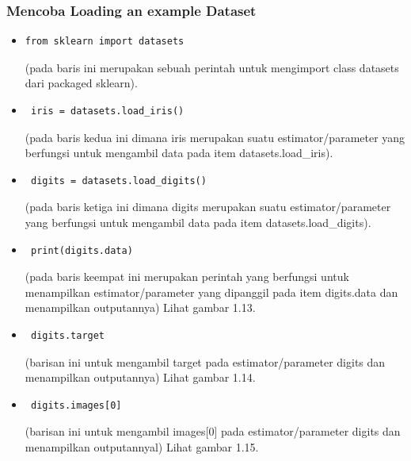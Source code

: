 \subsubsection{Mencoba Loading an example Dataset}
\begin{itemize}
\item\begin{verbatim}from sklearn import datasets\end{verbatim}(pada baris ini merupakan sebuah perintah untuk mengimport class datasets dari packaged sklearn).
\item\begin{verbatim} iris = datasets.load_iris()\end{verbatim}(pada baris kedua ini dimana iris merupakan suatu estimator/parameter yang berfungsi untuk mengambil data pada item datasets.load\_iris).
\item\begin{verbatim} digits = datasets.load_digits()\end{verbatim}(pada baris ketiga ini dimana digits merupakan suatu estimator/parameter yang berfungsi untuk mengambil data pada item datasets.load\_digits).
\item\begin{verbatim} print(digits.data)\end{verbatim}(pada baris keempat ini merupakan perintah yang berfungsi untuk menampilkan estimator/parameter yang dipanggil pada item digits.data dan menampilkan outputannya) Lihat gambar 1.13.
\item\begin{verbatim} digits.target\end{verbatim}(barisan ini untuk mengambil target pada estimator/parameter digits dan menampilkan outputannya) Lihat gambar 1.14.
\item\begin{verbatim} digits.images[0]\end{verbatim}(barisan ini untuk mengambil images[0] pada estimator/parameter digits dan menampilkan outputannyal) Lihat gambar 1.15.
\end{itemize}
